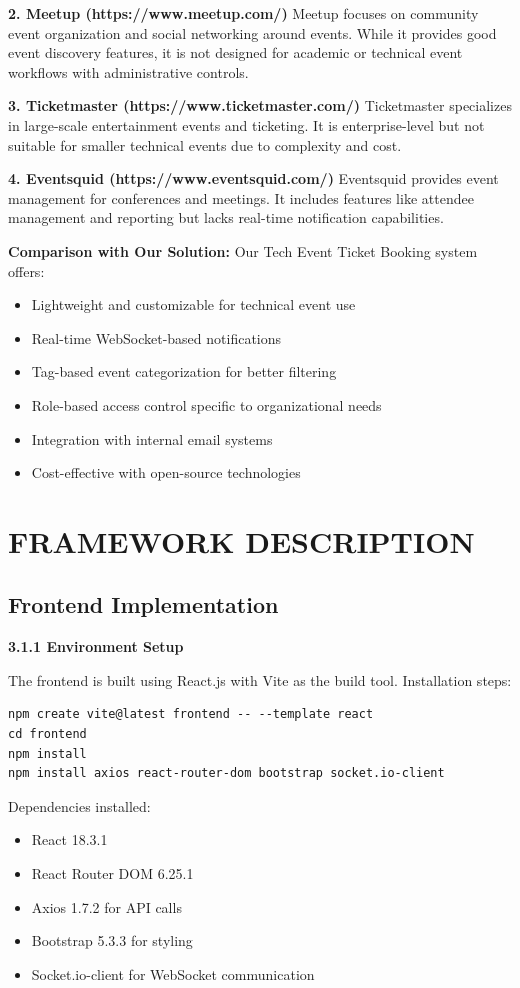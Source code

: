 \documentclass[12pt]{report}
\begin{document}
\textbf{2. Meetup (https://www.meetup.com/)}
Meetup focuses on community event organization and social networking around events. While it provides good event discovery features, it is not designed for academic or technical event workflows with administrative controls.

\textbf{3. Ticketmaster (https://www.ticketmaster.com/)}
Ticketmaster specializes in large-scale entertainment events and ticketing. It is enterprise-level but not suitable for smaller technical events due to complexity and cost.

\textbf{4. Eventsquid (https://www.eventsquid.com/)}
Eventsquid provides event management for conferences and meetings. It includes features like attendee management and reporting but lacks real-time notification capabilities.

\textbf{Comparison with Our Solution:}
Our Tech Event Ticket Booking system offers:
\begin{itemize}
\item Lightweight and customizable for technical event use
\item Real-time WebSocket-based notifications
\item Tag-based event categorization for better filtering
\item Role-based access control specific to organizational needs
\item Integration with internal email systems
\item Cost-effective with open-source technologies
\end{itemize}

 
\chapter{FRAMEWORK DESCRIPTION} 
\linespread{1.5} 
\section{Frontend Implementation} 
\textbf{3.1.1 Environment Setup}

The frontend is built using React.js with Vite as the build tool. Installation steps:

\begin{lstlisting}
npm create vite@latest frontend -- --template react
cd frontend
npm install
npm install axios react-router-dom bootstrap socket.io-client
\end{lstlisting}

Dependencies installed:
\begin{itemize}
\item React 18.3.1
\item React Router DOM 6.25.1
\item Axios 1.7.2 for API calls
\item Bootstrap 5.3.3 for styling
\item Socket.io-client for WebSocket communication
\end{itemize}
\end{document}
